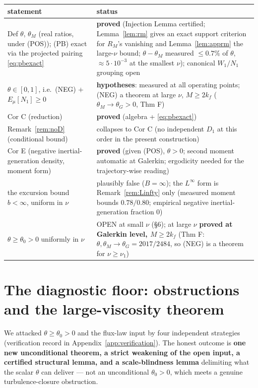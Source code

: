\documentclass[11pt]{article}
\theoremstyle{remark}
\theoremstyle{plain}
\begin{document}
\begin{center}
\begin{tabular}{p{}p{}}
\hline
statement & status \\
\hline
Def $\theta$, $\theta_M$ (real ratios, under (POS)); (PB) exact via the projected pairing \eqref{eq:pbexact} & \textbf{proved} (Injection Lemma certified; Lemma~\ref{lem:rm} gives an exact support criterion for $R_M$'s vanishing and Lemma~\ref{lem:apprm} the large-$\nu$ bound; $\theta-\theta_M$ measured $\le 0.7\%$ of $\theta$, $\approx 5\cdot10^{-3}$ at the smallest $\nu$); canonical $W_1/N_1$ grouping open \\
$\theta \in [0,1]$, i.e.\ (NEG) $+$ $E_\mu[N_1]\ge0$ & \textbf{hypotheses}: measured at all operating points; (NEG) a theorem at large $\nu$, $M \ge 2k_f$ ($\theta_M\to\theta_G>0$, Thm F) \\
Cor C (reduction) & \textbf{proved} (algebra + \eqref{eq:pbexact}) \\
Remark~\ref{rem:noD} (conditional bound) & collapses to Cor C (no independent $D_1$ at this order in the present construction) \\
Cor E (negative inertial-generation density, moment form) & \textbf{proved} (given (POS), $\theta>0$; second moment automatic at Galerkin; ergodicity needed for the trajectory-wise reading) \\
the excursion bound $b < \infty$, uniform in $\nu$ & plausibly false ($B=\infty$); the $L^\infty$ form is Remark~\ref{rem:Linfty} only (measured moment bounds $0.78/0.80$; empirical negative inertial-generation fraction $0$) \\
$\theta \ge \theta_0 > 0$ uniformly in $\nu$ & OPEN at small $\nu$ (\S6); at large $\nu$ \textbf{proved at Galerkin level, $M \ge 2k_f$} (Thm F: $\theta, \theta_M \to \theta_G = 2017/2484$, so (NEG) is a theorem for $\nu \ge \nu_1$) \\
\hline
\end{tabular}
\end{center}

\section{The diagnostic floor: obstructions and the large-viscosity theorem}

We attacked $\theta \ge \theta_0 > 0$ and the flux-law input by four independent
strategies (verification record in Appendix~\ref{app:verification}). The honest outcome is \textbf{one new unconditional
theorem, a strict weakening of the open input, a certified structural lemma, and a
scale-blindness lemma} delimiting what the scalar $\theta$ can deliver --- not an
unconditional $\theta_0 > 0$, which meets a genuine turbulence-closure obstruction.
\end{document}
